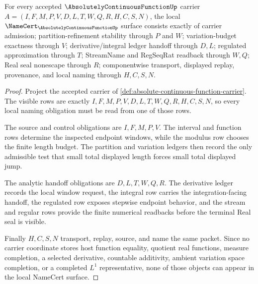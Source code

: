 \begin{theorem}
\label{thm:absolute-continuous-function-namecert-obligations}
For every accepted $\AbsolutelyContinuousFunctionUp$ carrier $A=(I,F,M,P,V,D,L,T,W,Q,R,H,C,S,N)$, the local $\NameCert_{\AbsolutelyContinuousFunctionUp}$ surface consists exactly of carrier admission; partition-refinement stability through $P$ and $W$; variation-budget exactness through $V$; derivative/integral ledger handoff through $D,L$; regulated approximation through $T$; StreamName and RegSeqRat readback through $W,Q$; Real seal nonescape through $R$; componentwise transport, displayed replay, provenance, and local naming through $H,C,S,N$.
\end{theorem}
\begin{proof}
Project the accepted carrier of \autoref{def:absolute-continuous-function-carrier}. The visible rows are exactly $I,F,M,P,V,D,L,T,W,Q,R,H,C,S,N$, so every local naming obligation must be read from one of those rows.

The source and control obligations are $I,F,M,P,V$. The interval and function rows determine the inspected endpoint windows, while the modulus row chooses the finite length budget. The partition and variation ledgers then record the only admissible test that small total displayed length forces small total displayed jump.

The analytic handoff obligations are $D,L,T,W,Q,R$. The derivative ledger records the local window request, the integral row carries the integration-facing handoff, the regulated row exposes stepwise endpoint behavior, and the stream and regular rows provide the finite numerical readbacks before the terminal Real seal is visible.

Finally $H,C,S,N$ transport, replay, source, and name the same packet. Since no carrier coordinate stores host function equality, quotient real functions, measure completion, a selected derivative, countable additivity, ambient variation space completion, or a completed $L^1$ representative, none of those objects can appear in the local NameCert surface.
\end{proof}

